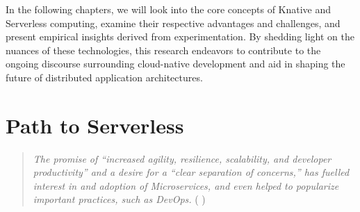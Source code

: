 \documentclass{article}
\begin{document}
\begin{flushleft}
In the following chapters, we will look into the core concepts of Knative and Serverless computing, examine their respective advantages and challenges, and present empirical insights derived from experimentation. By shedding light on the nuances of these technologies, this research endeavors to contribute to the ongoing discourse surrounding cloud-native development and aid in shaping the future of distributed application architectures.
\end{flushleft}
\pagebreak
\section{Path to Serverless}
\begin{quote}
    \textit{The promise of “increased agility, resilience, scalability, and developer productivity” and a desire for a “clear separation of concerns,” has fuelled interest in and adoption of Microservices, and even helped to popularize important practices, such as DevOps.}  ( \cite{KillaleaTom-2016} )
\end{quote}
\end{document}
